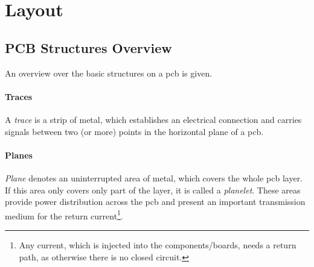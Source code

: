 \section{Layout}


\subsection{PCB Structures Overview} \label{ssec:pcb_structs}
An overview over the basic structures on a \gls{pcb} is given.

\paragraph{Traces}
A \textit{trace} is a strip of metal, which establishes an electrical connection and carries signals between two (or more) points in the horizontal plane of a \gls{pcb}. \cite{xilDecouple}


\paragraph{Planes}
\textit{Plane} denotes an uninterrupted area of metal, which covers the whole \gls{pcb} layer. If this area only covers only part of the layer, it is called a \textit{planelet}. These areas provide power distribution across the \gls{pcb} and present an important transmission medium for the return current\footnote{Any current, which is injected into the components/boards, needs a return path, as otherwise there is no closed circuit.}. \cite{xilDecouple}

